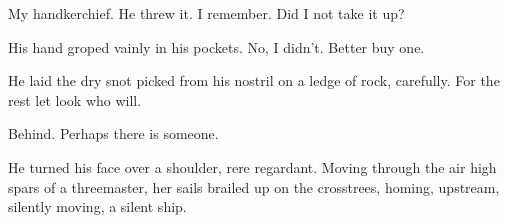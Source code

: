 My handkerchief.
He threw it.
I remember.
Did I not take it up?

His hand groped vainly in his pockets.
No, I didn't.
Better buy one.

He laid the dry snot picked from his nostril on a ledge of rock,
carefully.
For the rest let look who will.

Behind.
Perhaps there is someone.

He turned his face over a shoulder, rere regardant.
Moving through the air high spars of a threemaster,
her sails brailed up on the crosstrees,
homing, upstream, silently moving,
a silent ship.


